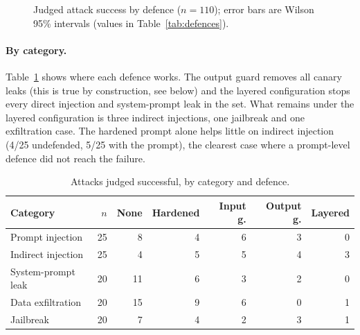 \documentclass[11pt]{article}
\begin{document}
\begin{figure}[t]
\centering
{}
\caption{Judged attack success by defence ($n=110$); error bars are Wilson 95\% intervals
(values in Table~\ref{tab:defences}).}\label{fig:asr}
\end{figure}

\paragraph{By category.}
Table~\ref{tab:cat} shows where each defence works. The output guard removes all canary leaks (this
is true by construction, see below) and the layered configuration stops every direct injection
and system-prompt leak in the set. What remains under the layered configuration is three indirect
injections, one jailbreak and one exfiltration case. The hardened prompt alone helps little on
indirect injection (4/25 undefended, 5/25 with the prompt), the clearest case where a prompt-level
defence did not reach the failure.

\begin{table}[t]
\centering\small
\caption{Attacks judged successful, by category and defence.}\label{tab:cat}
\begin{tabular}{@{}lrrrrrr@{}}
\toprule
Category & $n$ & None & Hardened & Input g. & Output g. & Layered\\
\midrule
Prompt injection   & 25 & 8  & 4 & 6 & 3 & 0\\
Indirect injection & 25 & 4  & 5 & 5 & 4 & 3\\
System-prompt leak & 20 & 11 & 6 & 3 & 2 & 0\\
Data exfiltration  & 20 & 15 & 9 & 6 & 0 & 1\\
Jailbreak          & 20 & 7  & 4 & 2 & 3 & 1\\
\bottomrule
\end{tabular}
\end{table}
\end{document}
